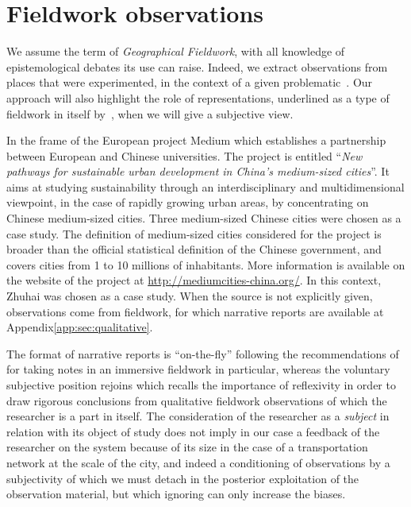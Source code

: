 \section{Fieldwork observations}


We assume the term of \emph{Geographical Fieldwork}, with all knowledge of epistemological debates its use can raise. Indeed, we extract observations from places that were experimented, in the context of a given problematic~\cite{retaille2010terrain}. Our approach will also highlight the role of representations, underlined as a type of fieldwork in itself by~\cite{lefort2012terrain}, when we will give a subjective view.

In the frame of the European project Medium which establishes a partnership between European and Chinese universities. The project is entitled ``\textit{New pathways for sustainable urban development in China’s medium-sized cities}''. It aims at studying sustainability through an interdisciplinary and multidimensional viewpoint, in the case of rapidly growing urban areas, by concentrating on Chinese medium-sized cities. Three medium-sized Chinese cities were chosen as a case study. The definition of medium-sized cities considered for the project is broader than the official statistical definition of the Chinese government, and covers cities from 1 to 10 millions of inhabitants. More information is available on the website of the project at \url{http://mediumcities-china.org/}. In this context, Zhuhai was chosen as a case study. When the source is not explicitly given, observations come from fieldwork, for which narrative reports are available at %
 Appendix\ref{app:sec:qualitative}.

 The format of narrative reports is ``on-the-fly'' following the recommendations of \cite{goffman1989fieldwork} for taking notes in an immersive fieldwork in particular, whereas the voluntary subjective position rejoins \cite{ball1990self} which recalls the importance of reflexivity in order to draw rigorous conclusions from qualitative fieldwork observations of which the researcher is a part in itself. The consideration of the researcher as a \emph{subject} in relation with its object of study does not imply in our case a feedback of the researcher on the system because of its size in the case of a transportation network at the scale of the city, and indeed a conditioning of observations by a subjectivity of which we must detach in the posterior exploitation of the observation material, but which ignoring can only increase the biases.


